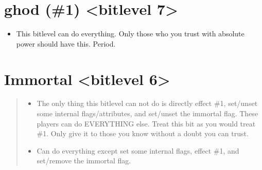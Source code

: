 \documentclass[letterpaper,10pt,english]{sphinxmanual}
\begin{document}
\section{ghod (\#1) \textless{}bitlevel 7\textgreater{}}
\label{\detokenize{15-bitlevels:ghod-1-bitlevel-7}}\begin{itemize}
\item {} 
\sphinxAtStartPar
This bitlevel can do everything.  Only those who you trust with
absolute power should have this.  Period.

\end{itemize}


\section{Immortal \textless{}bitlevel 6\textgreater{}}
\label{\detokenize{15-bitlevels:immortal-bitlevel-6}}\begin{quote}
\begin{itemize}
\item {} 
\sphinxAtStartPar
The only thing this bitlevel can not do is directly effect \#1,
set/unset some internal flags/attributes, and set/unset the
immortal flag.  These players can do EVERYTHING else.  Treat
this bit as you would treat \#1.  Only give it to those you know
without a doubt you can trust.

\end{itemize}
\begin{itemize}
\item {} 
\sphinxAtStartPar
Can do everything except set some internal flags, effect \#1,
and set/remove the immortal flag.

\end{itemize}
\end{quote}
\end{document}
